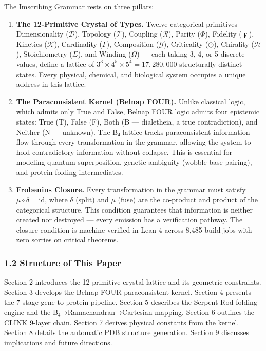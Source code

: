 \documentclass[12pt,a4paper]{article}
\begin{document}
The Imscribing Grammar rests on three pillars:

\begin{enumerate}
\def\labelenumi{\arabic{enumi}.}
\item
  \textbf{The 12-Primitive Crystal of Types.} Twelve categorical
  primitives --- Dimensionality (\(\mathcal{D}\)), Topology
  (\(\mathcal{T}\)), Coupling (\(\mathcal{R}\)), Parity (\(\Phi\)),
  Fidelity (\(\digamma\)), Kinetics (\(\mathcal{K}\)), Cardinality
  (\(\Gamma\)), Composition (\(\mathcal{G}\)), Criticality (\(\odot\)),
  Chirality (\(\mathcal{H}\)), Stoichiometry (\(\Sigma\)), and Winding
  (\(\Omega\)) --- each taking 3, 4, or 5 discrete values, define a
  lattice of \(3^3 \times 4^5 \times 5^4 = 17,280,000\) structurally
  distinct states. Every physical, chemical, and biological system
  occupies a unique address in this lattice.
\item
  \textbf{The Paraconsistent Kernel (Belnap FOUR).} Unlike classical
  logic, which admits only True and False, Belnap FOUR logic admits four
  epistemic states: True (T), False (F), Both (B --- dialetheia, a true
  contradiction), and Neither (N --- unknown). The B₄ lattice tracks
  paraconsistent information flow through every transformation in the
  grammar, allowing the system to hold contradictory information without
  collapse. This is essential for modeling quantum superposition,
  genetic ambiguity (wobble base pairing), and protein folding
  intermediates.
\item
  \textbf{Frobenius Closure.} Every transformation in the grammar must
  satisfy \(\mu \circ \delta = \text{id}\), where \(\delta\) (split) and
  \(\mu\) (fuse) are the co-product and product of the categorical
  structure. This condition guarantees that information is neither
  created nor destroyed --- every emission has a verification pathway.
  The closure condition is machine-verified in Lean 4 across 8,485 build
  jobs with zero sorries on critical theorems.
\end{enumerate}

\hypertarget{structure-of-this-paper}{%
\subsubsection{1.2 Structure of This
Paper}\label{structure-of-this-paper}}

Section 2 introduces the 12-primitive crystal lattice and its geometric
constraints. Section 3 develops the Belnap FOUR paraconsistent kernel.
Section 4 presents the 7-stage gene-to-protein pipeline. Section 5
describes the Serpent Rod folding engine and the
B₄→Ramachandran→Cartesian mapping. Section 6 outlines the CLINK 9-layer
chain. Section 7 derives physical constants from the kernel. Section 8
details the automatic PDB structure generation. Section 9 discusses
implications and future directions.
\end{document}
